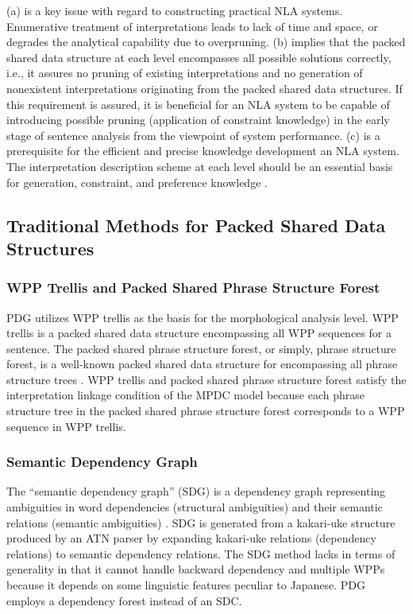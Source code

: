 \documentclass[english]{jnlp_1.4_rep}
\theoremstyle{break}
\theoremstyle{plain}
\theoremstyle{plain}
\begin{document}
\noindent
(a) is a key issue with regard to constructing practical
NLA systems. Enumerative treatment of interpretations leads to lack of
time and space, or degrades the analytical capability due to
overpruning. (b) implies that the packed shared data structure at each
level encompasses all possible solutions correctly, i.e., it assures
no pruning of existing interpretations and no generation of
nonexistent interpretations originating from the packed shared data
structures. If this requirement is assured, it is beneficial for an
NLA system to be capable of introducing possible pruning (application
of constraint knowledge) in the early stage of sentence analysis from
the viewpoint of system performance. (c) is a prerequisite for the
efficient and precise knowledge development an NLA system. The
interpretation description scheme at each level should be an essential
basis for generation, constraint, and preference knowledge
\cite{Hirakawa02_e}.


\subsection{Traditional Methods for Packed Shared Data Structures}

\subsubsection{WPP Trellis and Packed Shared Phrase Structure Forest}

PDG utilizes WPP trellis as the basis for the morphological analysis
level. WPP trellis is a packed shared data structure encompassing all
WPP sequences for a sentence. The packed shared phrase structure
forest, or simply, phrase structure forest, is a well-known packed
shared data structure for encompassing all phrase structure trees
\cite{Tomita87}. WPP trellis and packed shared phrase structure forest
satisfy the interpretation linkage condition of the MPDC model because
each phrase structure tree in the packed shared phrase structure
forest corresponds to a WPP sequence in WPP trellis.


\subsubsection{Semantic Dependency Graph}
\label{sec:SemDdpGrp}

The ``semantic dependency graph'' (SDG) is a dependency graph
representing ambiguities in word dependencies (structural ambiguities)
and their semantic relations (semantic ambiguities)
\cite{Hirakawa02_e}. SDG is generated from a kakari-uke structure
produced by an ATN parser by expanding kakari-uke relations (dependency
relations) to semantic dependency relations. The SDG method lacks
in terms of generality in that it cannot handle backward dependency
and multiple WPPs because it depends on some linguistic features
peculiar to Japanese. PDG employs a dependency forest instead of an
SDC.
\end{document}
